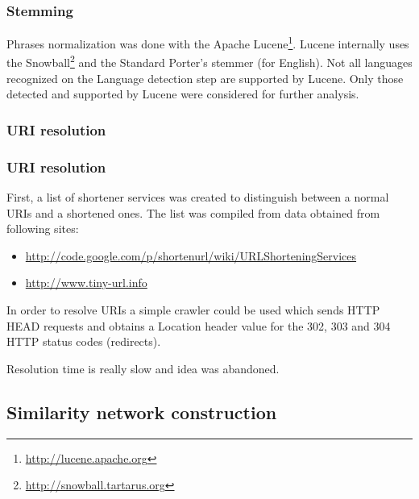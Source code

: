 \documentclass[handout]{beamer}
\begin{document}

\begin{frame}
\frametitle{\bf Stemming}

Phrases normalization was done with the Apache Lucene\footnote{\url{http://lucene.apache.org}}.
Lucene internally uses the Snowball\footnote{\url{http://snowball.tartarus.org}} and the Standard Porter’s stemmer (for English).
Not all languages recognized on the Language detection step are supported by Lucene.
Only those detected and supported by Lucene were considered for further analysis.

\end{frame}


\subsubsection{URI resolution}


\begin{frame}
\frametitle{\bf URI resolution}

First, a list of shortener services was created to distinguish between a normal URIs and a shortened ones. The list was compiled from data obtained from following sites:

\begin{itemize}
\item \url{http://code.google.com/p/shortenurl/wiki/URLShorteningServices}
\item \url{http://www.tiny-url.info}
\end{itemize}

In order to resolve URIs a simple crawler could be used which sends HTTP HEAD requests and obtains a Location header value for the 302, 303 and 304 HTTP status codes (redirects).

Resolution time is really slow and idea was abandoned.
\end{frame}


\subsection{Similarity network construction}
\end{document}

